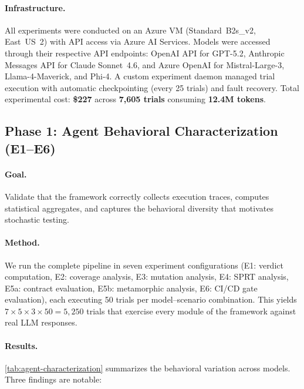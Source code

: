 \paragraph{Infrastructure.}
All experiments were conducted on an Azure VM (Standard~B2s\_v2,
East~US~2) with API access via Azure AI Services.
Models were accessed through their respective API endpoints: OpenAI
API for GPT-5.2, Anthropic Messages API for Claude Sonnet~4.6, and
Azure OpenAI for Mistral-Large-3, Llama-4-Maverick, and Phi-4.
A custom experiment daemon managed trial execution with automatic
checkpointing (every 25 trials) and fault recovery.
Total experimental cost: \textbf{\$227} across \textbf{7{,}605 trials}
consuming \textbf{12.4M tokens}.

\subsection{Phase 1: Agent Behavioral Characterization (E1--E6)}
\label{sec:experiments:characterization}

\paragraph{Goal.} Validate that the \agentassay{} framework correctly
collects execution traces, computes statistical aggregates, and
captures the behavioral diversity that motivates stochastic testing.

\paragraph{Method.}
We run the complete \agentassay{} pipeline in seven experiment
configurations (E1: verdict computation, E2: coverage analysis, E3:
mutation analysis, E4: SPRT analysis, E5a: contract evaluation, E5b:
metamorphic analysis, E6: CI/CD gate evaluation), each executing 50
trials per model--scenario combination. This yields
$7 \times 5 \times 3 \times 50 = 5{,}250$ trials that exercise every
module of the framework against real LLM responses.

\paragraph{Results.}
\cref{tab:agent-characterization} summarizes the behavioral variation
across models. Three findings are notable:

